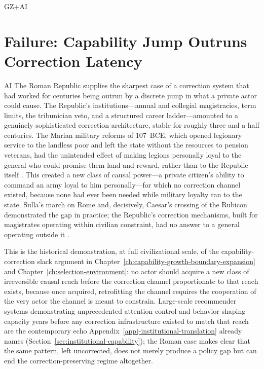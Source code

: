 \begin{refsection}
\begin{authbar}{GZ+AI}
\end{authbar}
\authbarneedspace
\section{Failure: Capability Jump Outruns Correction Latency}
\label{sec:appm-capability-latency}
\begin{authbar}{AI}
The Roman Republic supplies the sharpest case of a correction system that had worked for centuries being outrun by a discrete jump in what a private actor could cause. The Republic's institutions---annual and collegial magistracies, term limits, the tribunician veto, and a structured career ladder---amounted to a genuinely sophisticated correction architecture, stable for roughly three and a half centuries. The Marian military reforms of 107~BCE, which opened legionary service to the landless poor and left the state without the resources to pension veterans, had the unintended effect of making legions personally loyal to the general who could promise them land and reward, rather than to the Republic itself \autocite{keaveney2007army}. This created a new class of causal power---a private citizen's ability to command an army loyal to him personally---for which no correction channel existed, because none had ever been needed while military loyalty ran to the state. Sulla's march on Rome and, decisively, Caesar's crossing of the Rubicon demonstrated the gap in practice; the Republic's correction mechanisms, built for magistrates operating within civilian constraint, had no answer to a general operating outside it \autocite{gruen1995lastgeneration}.

This is the historical demonstration, at full civilizational scale, of the capability-correction slack argument in Chapter~\ref{ch:capability-growth-boundary-expansion} and Chapter~\ref{ch:selection-environment}: no actor should acquire a new class of irreversible causal reach before the correction channel proportionate to that reach exists, because once acquired, retrofitting the channel requires the cooperation of the very actor the channel is meant to constrain. Large-scale recommender systems demonstrating unprecedented attention-control and behavior-shaping capacity years before any correction infrastructure existed to match that reach are the contemporary echo Appendix~\ref{appj-institutional-translation} already names (Section~\ref{sec:institutional-capability}); the Roman case makes clear that the same pattern, left uncorrected, does not merely produce a policy gap but can end the correction-preserving regime altogether.


\end{authbar}
\end{refsection}
